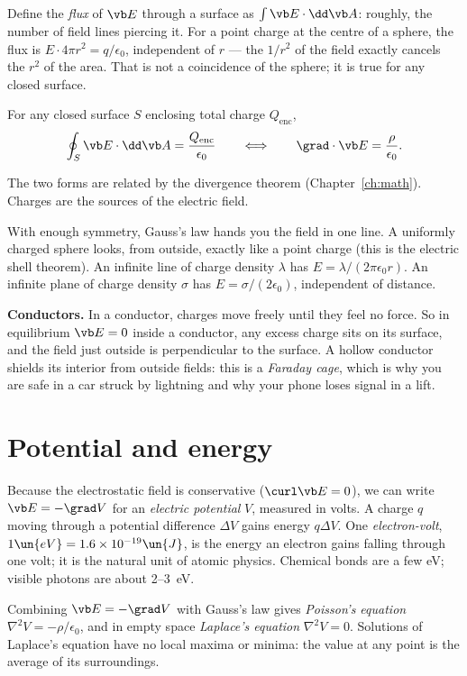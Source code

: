 Define the \emph{flux} of $\vb E$ through a surface as $\int\vb E\cdot\dd\vb A$: roughly, the number of field lines piercing it. For a point charge at the centre of a sphere, the flux is $E\cdot 4\pi r^2 = q/\epsilon_0$, independent of $r$ --- the $1/r^2$ of the field exactly cancels the $r^2$ of the area. That is not a coincidence of the sphere; it is true for any closed surface.

\begin{law}
For any closed surface $S$ enclosing total charge $Q_{\text{enc}}$,
\[
  \oint_S \vb E\cdot\dd\vb A = \frac{Q_{\text{enc}}}{\epsilon_0}
  \qquad\Longleftrightarrow\qquad
  \grad\cdot\vb E = \frac{\rho}{\epsilon_0}.
\]
\end{law}
The two forms are related by the divergence theorem (Chapter~\ref{ch:math}). Charges are the sources of the electric field.

With enough symmetry, Gauss's law hands you the field in one line. A uniformly charged sphere looks, from outside, exactly like a point charge (this is the electric shell theorem). An infinite line of charge density $\lambda$ has $E = \lambda/(2\pi\epsilon_0 r)$. An infinite plane of charge density $\sigma$ has $E = \sigma/(2\epsilon_0)$, independent of distance.

\textbf{Conductors.} In a conductor, charges move freely until they feel no force. So in equilibrium $\vb E = 0$ inside a conductor, any excess charge sits on its surface, and the field just outside is perpendicular to the surface. A hollow conductor shields its interior from outside fields: this is a \emph{Faraday cage}, which is why you are safe in a car struck by lightning and why your phone loses signal in a lift.

\section{Potential and energy}

Because the electrostatic field is conservative ($\curl\vb E = 0$), we can write $\vb E = -\grad V$ for an \emph{electric potential} $V$, measured in volts. A charge $q$ moving through a potential difference $\Delta V$ gains energy $q\Delta V$. One \emph{electron-volt}, $1\un{eV} = 1.6\times10^{-19}\un{J}$, is the energy an electron gains falling through one volt; it is the natural unit of atomic physics. Chemical bonds are a few eV; visible photons are about 2--3~eV.

Combining $\vb E = -\grad V$ with Gauss's law gives \emph{Poisson's equation} $\nabla^2V = -\rho/\epsilon_0$, and in empty space \emph{Laplace's equation} $\nabla^2 V = 0$. Solutions of Laplace's equation have no local maxima or minima: the value at any point is the average of its surroundings.

